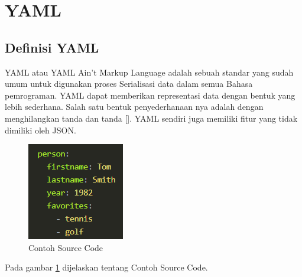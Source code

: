 \documentclass[a4paper]{article}
\begin{document}
\section{YAML}
\subsection{Definisi YAML}
YAML atau YAML Ain't Markup Language adalah sebuah standar yang sudah umum untuk digunakan proses Serialisasi data dalam semua Bahasa pemrograman. YAML dapat memberikan representasi data dengan bentuk yang lebih sederhana. Salah satu bentuk penyederhanaan nya adalah dengan menghilangkan tanda {} dan tanda []. YAML sendiri juga memiliki fitur yang tidak dimiliki oleh JSON.
\begin{figure}[ht]
\centerline{\includegraphics[scale=1]{../figures/5SC.png} }

\caption{Contoh Source Code} 
\label{Sc}
\end{figure}

Pada gambar \ref{Sc} dijelaskan tentang Contoh Source Code.
\end{document}
